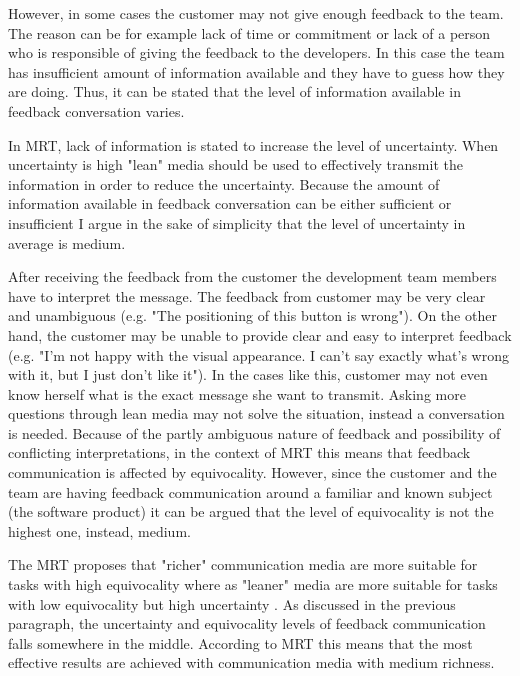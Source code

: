\documentclass[english,12pt,a4paper,pdftex]{article}
\begin{document}
However, in some cases the customer may not give enough feedback to the team. The reason can be for example lack of time or commitment or lack of a person who is responsible of giving the feedback to the developers. In this case the team has insufficient amount of information available and they have to guess how they are doing. Thus, it can be stated that the level of information available in feedback conversation varies. 

In \ac{MRT}, lack of information is stated to increase the level of uncertainty. When uncertainty is high "lean" media should be used to effectively transmit the information in order to reduce the uncertainty. Because the amount of information available in feedback conversation can be either sufficient or insufficient I argue in the sake of simplicity that the level of uncertainty in average is medium.

After receiving the feedback from the customer the development team members have to interpret the message. The feedback from customer may be very clear and unambiguous (e.g. "The positioning of this button is wrong"). On the other hand, the customer may be unable to provide clear and easy to interpret feedback (e.g. "I'm not happy with the visual appearance. I can't say exactly what's wrong with it, but I just don't like it"). In the cases like this, customer may not even know herself what is the exact message she want to transmit. Asking more questions through lean media may not solve the situation, instead a conversation is needed. Because of the partly ambiguous nature of feedback and possibility of conflicting interpretations, in the context of \ac{MRT} this means that feedback communication is affected by equivocality. However, since the customer and the team are having feedback communication around a familiar and known subject (the software product) it can be argued that the level of equivocality is not the highest one, instead, medium.

The \ac{MRT} proposes that "richer" communication media are more suitable for tasks with high equivocality where as "leaner" media are more suitable for tasks with low equivocality but high uncertainty \citep{daft1986}. As discussed in the previous paragraph, the uncertainty and equivocality levels of feedback communication falls somewhere in the middle. According to \ac{MRT} this means that the most effective results are achieved with communication media with medium richness.

\end{document}
